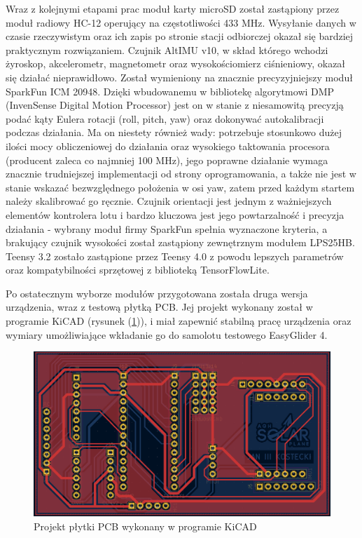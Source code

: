 \documentclass[12pt, a4paper]{article}
\let\oldref\ref
\renewcommand{\ref}[1]{(\oldref{#1})}
\begin{document}
Wraz z kolejnymi etapami prac moduł karty microSD został zastąpiony przez moduł radiowy HC-12 operujący na częstotliwości 433 MHz. Wysyłanie danych w czasie rzeczywistym oraz ich zapis po stronie stacji odbiorczej okazał się bardziej praktycznym rozwiązaniem. Czujnik AltIMU v10, w skład którego wchodzi żyroskop, akcelerometr, magnetometr oraz wysokościomierz ciśnieniowy, okazał się działać nieprawidłowo. Został wymieniony na znacznie precyzyjniejszy moduł SparkFun ICM 20948. Dzięki wbudowanemu w bibliotekę algorytmowi DMP (InvenSense Digital Motion Processor) jest on w stanie z niesamowitą precyzją podać kąty Eulera rotacji (roll, pitch, yaw) oraz dokonywać autokalibracji podczas działania. Ma on niestety również wady: potrzebuje stosunkowo dużej ilości mocy obliczeniowej do działania oraz wysokiego taktowania procesora (producent zaleca co najmniej 100 MHz), jego poprawne działanie wymaga znacznie trudniejszej implementacji od strony oprogramowania, a także nie jest w stanie wskazać bezwzględnego położenia w osi yaw, zatem przed każdym startem należy skalibrować go ręcznie. Czujnik orientacji jest jednym z ważniejszych elementów kontrolera lotu i bardzo kluczowa jest jego powtarzalność i precyzja działania - wybrany moduł firmy SparkFun spełnia wyznaczone kryteria, a brakujący czujnik wysokości został zastąpiony zewnętrznym modułem LPS25HB. Teensy 3.2 zostało zastąpione przez Teensy 4.0 z powodu lepszych parametrów oraz kompatybilności sprzętowej z biblioteką TensorFlowLite.

Po ostatecznym wyborze modułów przygotowana została druga wersja urządzenia, wraz  z testową płytką PCB. Jej projekt wykonany został w programie KiCAD (rysunek \ref{fig:axd}), i miał zapewnić stabilną pracę urządzenia oraz wymiary umożliwiające wkładanie go do samolotu testowego EasyGlider 4. 

 \begin{figure}[ht]
    \centering
    \includegraphics[width=1\textwidth]{plytkastara}
    \caption{Projekt płytki PCB wykonany w programie KiCAD}
    \label{fig:axd}
\end{figure}
\end{document}
